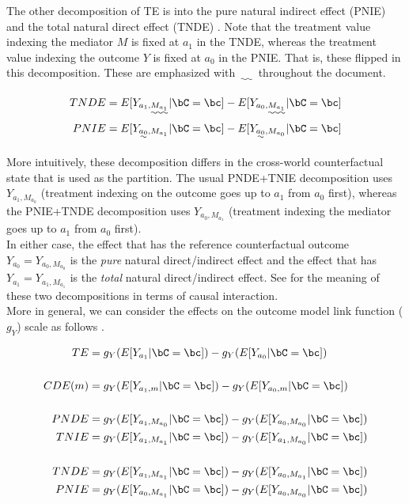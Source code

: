 \documentclass[dvipdfmx,10pt]{article}
\begin{document}
The other decomposition of TE is into the pure natural indirect effect (PNIE) and the total natural direct effect (TNDE) \cite{robinsIdentifiabilityExchangeabilityDirect1992}. Note that the treatment value indexing the mediator \(M\) is fixed at \(a_{1}\) in the TNDE, whereas the treatment value indexing the outcome \(Y\) is fixed at \(a_{0}\) in the PNIE. That is, these flipped in this decomposition. These are emphasized with \(\uwave{~~~~}\) throughout the document.

\begin{align*}
  TNDE &= E[Y_{a_{1},\uwave{M_{a_{1}}}} | \bC = \bc] - E[Y_{a_{0},\uwave{M_{a_{1}}}} | \bC = \bc]\\
  PNIE &= E[Y_{\uwave{a_{0}},M_{a_{1}}} | \bC = \bc] - E[Y_{\uwave{a_{0}},M_{a_{0}}} | \bC = \bc]\\
\end{align*}

More intuitively, these decomposition differs in the cross-world counterfactual state that is used as the partition. The usual PNDE+TNIE decomposition uses \(Y_{a_{1},M_{a_{0}}}\) (treatment indexing on the outcome goes up to \(a_{1}\) from \(a_{0}\) first), whereas the PNIE+TNDE decomposition uses \(Y_{a_{0},M_{a_{1}}}\) (treatment indexing the mediator goes up to \(a_{1}\) from \(a_{0}\) first).\\

In either case, the effect that has the reference counterfactual outcome \(Y_{a_{0}} = Y_{a_{0},M_{a_{0}}}\) is the \emph{pure} natural direct/indirect effect and the effect that has \(Y_{a_{1}} = Y_{a_{1},M_{a_{1}}}\) is the \emph{total} natural direct/indirect effect. See \cite{vanderweeleThreewayDecompositionTotal2013} for the meaning of these two decompositions in terms of causal interaction.\\

More in general, we can consider the effects on the outcome model link function (\(g_{Y}\)) scale as follows \cite{starkopfComparisonFiveSoftware2017}.

\begin{align*}
  TE &= g_{Y}(E[Y_{a_{1}} | \bC = \bc]) - g_{Y}(E[Y_{a_{0}} | \bC = \bc])\\
  \\
  CDE(m) &= g_{Y}(E[Y_{a_{1},m} | \bC = \bc]) - g_{Y}(E[Y_{a_{0},m} | \bC = \bc])\\
  \\
  PNDE &= g_{Y}(E[Y_{a_{1},M_{a_{0}}} | \bC = \bc]) - g_{Y}(E[Y_{a_{0},M_{a_{0}}} | \bC = \bc])\\
  TNIE &= g_{Y}(E[Y_{a_{1},M_{a_{1}}} | \bC = \bc]) - g_{Y}(E[Y_{a_{1},M_{a_{0}}} | \bC = \bc])\\
  \\
  TNDE &= g_{Y}(E[Y_{a_{1},M_{a_{1}}} | \bC = \bc]) - g_{Y}(E[Y_{a_{0},M_{a_{1}}} | \bC = \bc])\\
  PNIE &= g_{Y}(E[Y_{a_{0},M_{a_{1}}} | \bC = \bc]) - g_{Y}(E[Y_{a_{0},M_{a_{0}}} | \bC = \bc])\\
\end{align*}
\end{document}
